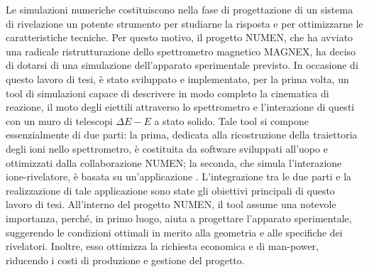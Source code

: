 

Le simulazioni numeriche costituiscono nella fase di progettazione di un sistema di rivelazione un potente strumento per studiarne la risposta e per ottimizzarne le caratteristiche tecniche.
Per questo motivo, il progetto NUMEN, che ha avviato una radicale ristrutturazione dello spettrometro magnetico MAGNEX, ha deciso di dotarsi di una simulazione dell'apparato sperimentale previsto.
In occasione di questo lavoro di tesi, è stato sviluppato e implementato, per la prima volta, un tool di simulazioni capace di descrivere in modo completo la cinematica di reazione, il moto degli eiettili attraverso lo spettrometro e l'interazione di questi con un muro di telescopi $\Delta E - E$ a stato solido.
%
Tale tool si compone essenzialmente di due parti: la prima, dedicata alla ricostruzione della traiettoria degli ioni nello spettrometro, è costituita da software sviluppati all'uopo e ottimizzati dalla collaborazione NUMEN; la seconda, che simula l'interazione ione-rivelatore, è basata su un'applicazione \geant.
L'integrazione tra le due parti e la realizzazione di tale applicazione sono state gli obiettivi principali di questo lavoro di tesi.
All'interno del progetto NUMEN, il tool assume una notevole importanza, perché, in primo luogo, aiuta a progettare l'apparato sperimentale, suggerendo le condizioni ottimali in merito alla geometria e alle specifiche dei rivelatori. 
Inoltre, esso ottimizza la richiesta economica e di man-power, riducendo i costi di produzione e gestione del progetto.

